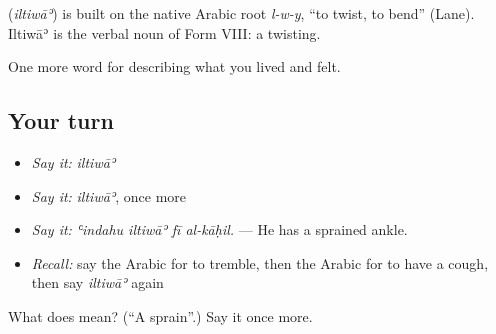 \begin{cousinweb}
\textbf{} (\emph{iltiwāʾ}) is built on the native Arabic root \emph{l-w-y}, \textquotedblleft{}to twist, to bend\textquotedblright{} (Lane). Iltiwāʾ is the verbal noun of Form VIII: a twisting.
\end{cousinweb}

\begin{grammarlens}[title={What you've built}]
One more word for describing what you lived and felt.
\end{grammarlens}

\subsection*{Your turn}
\begin{itemize}
\raggedright
  \item \emph{Say it:} \emph{iltiwāʾ}
  \item \emph{Say it:} \emph{iltiwāʾ}, once more
  \item \emph{Say it:} \emph{ʿindahu iltiwāʾ fī al-kāḥil.} — He has a sprained ankle.
  \item \emph{Recall:} say the Arabic for to tremble, then the Arabic for to have a cough, then say \emph{iltiwāʾ} again
\end{itemize}

\begin{tcolorbox}[breakable,colback=teal!4,colframe=teal!35!black,title={Before you move on}]
What does  mean? (\textquotedblleft{}A sprain\textquotedblright{}.) Say it once more.
\end{tcolorbox}
